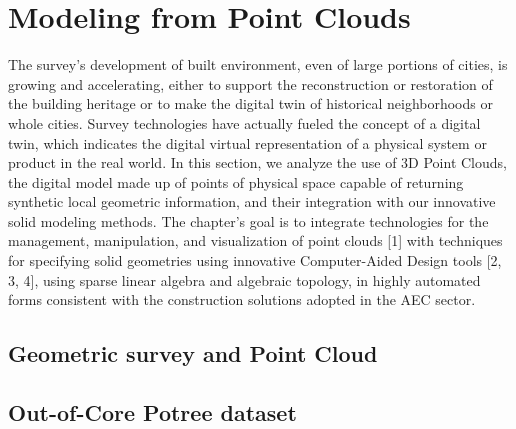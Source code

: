 \chapter{Modeling from Point Clouds}\label{chapt:11}

The survey’s development of built environment, even of large portions of cities, is growing and accelerating, either to support the reconstruction or restoration of the building heritage or to make the digital twin of historical neighborhoods or whole cities.
Survey technologies have actually fueled the concept of a digital twin, which indicates the digital virtual representation of a physical system or product in the real world.
In this section, we analyze the use of 3D Point Clouds, the digital model made up of points of physical space capable of returning synthetic local geometric information, and their integration with our innovative solid modeling methods.
The chapter's goal is to integrate technologies for the management, manipulation, and visualization of point clouds [1] with techniques for specifying solid geometries using innovative Computer-Aided Design tools [2, 3, 4], using sparse linear algebra and algebraic topology, in highly automated forms consistent with the construction solutions adopted in the AEC sector.



\section{ Geometric survey and Point Cloud}\label{sect:11-1}



\section{ Out-of-Core Potree dataset}\label{sect:11-2}




